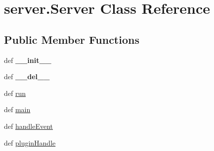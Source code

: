 \hypertarget{classserver_1_1_server}{\section{server.\-Server \-Class \-Reference}
\label{classserver_1_1_server}
}
\subsection*{\-Public \-Member \-Functions}
\begin{DoxyCompactItemize}
\item 
\hypertarget{classserver_1_1_server_a423441de73b670b0f72d1cd83e6e9b96}{def {\bfseries \-\_\-\-\_\-init\-\_\-\-\_\-}}\label{classserver_1_1_server_a423441de73b670b0f72d1cd83e6e9b96}

\item 
\hypertarget{classserver_1_1_server_ac80c3a945398c3c941f5d0820c823b88}{def {\bfseries \-\_\-\-\_\-del\-\_\-\-\_\-}}\label{classserver_1_1_server_ac80c3a945398c3c941f5d0820c823b88}

\item 
def \hyperlink{classserver_1_1_server_a9b3fa0cb53b66ff0f4b5cab8257e1f97}{run}
\item 
def \hyperlink{classserver_1_1_server_a00234be60c5d9f6fcb3dd40ce8b7eaf0}{main}
\item 
def \hyperlink{classserver_1_1_server_a27e7213342658fc1f0a689647963be9a}{handle\-Event}
\item 
def \hyperlink{classserver_1_1_server_a96a93fb7b3ede34e861cba3952cd85e2}{plugin\-Handle}
\end{DoxyCompactItemize}
